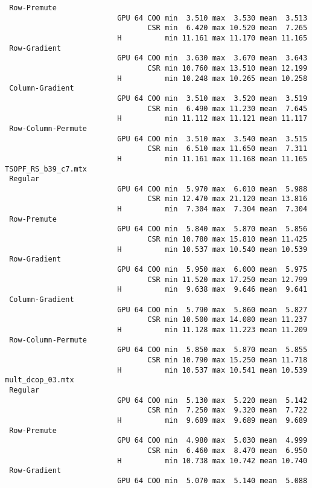 {\begin{verbatim}
 Row-Premute
                          GPU 64 COO min  3.510 max  3.530 mean  3.513
                                 CSR min  6.420 max 10.520 mean  7.265
                          H          min 11.161 max 11.170 mean 11.165
 Row-Gradient
                          GPU 64 COO min  3.630 max  3.670 mean  3.643
                                 CSR min 10.760 max 13.510 mean 12.199
                          H          min 10.248 max 10.265 mean 10.258
 Column-Gradient
                          GPU 64 COO min  3.510 max  3.520 mean  3.519
                                 CSR min  6.490 max 11.230 mean  7.645
                          H          min 11.112 max 11.121 mean 11.117
 Row-Column-Permute
                          GPU 64 COO min  3.510 max  3.540 mean  3.515
                                 CSR min  6.510 max 11.650 mean  7.311
                          H          min 11.161 max 11.168 mean 11.165
TSOPF_RS_b39_c7.mtx
 Regular
                          GPU 64 COO min  5.970 max  6.010 mean  5.988
                                 CSR min 12.470 max 21.120 mean 13.816
                          H          min  7.304 max  7.304 mean  7.304
 Row-Premute
                          GPU 64 COO min  5.840 max  5.870 mean  5.856
                                 CSR min 10.780 max 15.810 mean 11.425
                          H          min 10.537 max 10.540 mean 10.539
 Row-Gradient
                          GPU 64 COO min  5.950 max  6.000 mean  5.975
                                 CSR min 11.520 max 17.250 mean 12.799
                          H          min  9.638 max  9.646 mean  9.641
 Column-Gradient
                          GPU 64 COO min  5.790 max  5.860 mean  5.827
                                 CSR min 10.500 max 14.080 mean 11.237
                          H          min 11.128 max 11.223 mean 11.209
 Row-Column-Permute
                          GPU 64 COO min  5.850 max  5.870 mean  5.855
                                 CSR min 10.790 max 15.250 mean 11.718
                          H          min 10.537 max 10.541 mean 10.539
mult_dcop_03.mtx
 Regular
                          GPU 64 COO min  5.130 max  5.220 mean  5.142
                                 CSR min  7.250 max  9.320 mean  7.722
                          H          min  9.689 max  9.689 mean  9.689
 Row-Premute
                          GPU 64 COO min  4.980 max  5.030 mean  4.999
                                 CSR min  6.460 max  8.470 mean  6.950
                          H          min 10.738 max 10.742 mean 10.740
 Row-Gradient
                          GPU 64 COO min  5.070 max  5.140 mean  5.088

\end{verbatim}}
